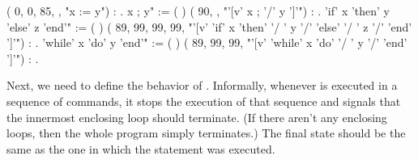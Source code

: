 \documentclass[12pt]{report}
\begin{document}
\begin{coqdoccode}
\coqdocindent{1.00em}
(     0,     0,    85,  ,\coqdoceol
\coqdocindent{2.00em}
 "x  :=  y") : .\coqdoceol
\coqdocnoindent
{} x ; y" := (  )\coqdoceol
\coqdocindent{1.00em}
(     90,\coqdoceol
\coqdocindent{2.00em}
 ,\coqdoceol
\coqdocindent{2.00em}
 "'[v' x ; '/' y ']'") : .\coqdoceol
\coqdocnoindent
{} 'if' x 'then' y 'else' z 'end'" := (   )\coqdoceol
\coqdocindent{1.00em}
(     89,    99,    99,    99,\coqdoceol
\coqdocindent{2.00em}
 "'[v' 'if'  x  'then' '/  ' y '/' 'else' '/  ' z '/' 'end' ']'") : .\coqdoceol
\coqdocnoindent
{} 'while' x 'do' y 'end'" := (  )\coqdoceol
\coqdocindent{1.00em}
(     89,    99,    99,\coqdoceol
\coqdocindent{2.00em}
 "'[v' 'while'  x  'do' '/  ' y '/' 'end' ']'") : .\coqdoceol
\coqdocemptyline
\end{coqdoccode}
Next, we need to define the behavior of .  Informally,
    whenever  is executed in a sequence of commands, it stops
    the execution of that sequence and signals that the innermost
    enclosing loop should terminate.  (If there aren't any
    enclosing loops, then the whole program simply terminates.)  The
    final state should be the same as the one in which the 
    statement was executed.
\end{document}
